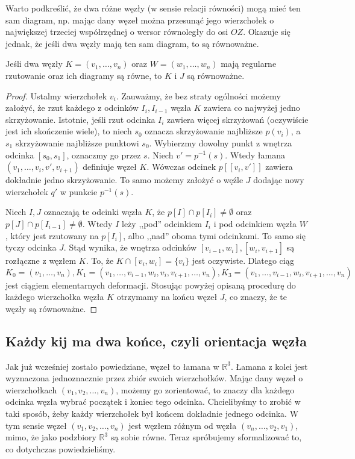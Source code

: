 Warto podkreślić, że dwa różne węzły (w sensie relacji równości) mogą mieć ten sam diagram, np. mając dany węzeł można przesunąć jego wierzchołek o największej trzeciej współrzędnej 
o wersor równoległy do osi $OZ$. Okazuje się jednak, że jeśli dwa węzły mają ten sam diagram, to są równoważne. 


\begin{twierdzenie}
 Jeśli dwa węzły $K = (v_1,\ldots, v_n)$ oraz $W = (w_1, \ldots, w_n)$ mają regularne rzutowanie oraz ich diagramy są równe, to $K$ i $J$ są równoważne.
\end{twierdzenie}
\begin{proof}
 Ustalmy wierzchołek $v_i$. Zauważmy, że bez straty ogólności możemy założyć, że rzut każdego z odcinków $I_i, I_{i-1}$ węzła $K$ zawiera co najwyżej jedno skrzyżowanie. 
 Istotnie, jeśli
 rzut odcinka $I_i$ zawiera więcej skrzyżowań (oczywiście jest ich skończenie wiele), to niech $s_0$ oznacza skrzyżowanie najbliższe $p(v_i)$, a $s_1$ skrzyżowanie najbliższe
 punktowi $s_0$. Wybierzmy dowolny punkt z wnętrza odcinka $[s_0, s_1]$, oznaczmy go przez $s$. Niech $v' = p^{-1}(s)$. Wtedy łamana $(v_1, \ldots, v_i, v', v_{i+1})$ definiuje 
 węzeł $K$. Wówczas odcinek $p[ [v_i, v']]$ zawiera dokładnie jedno skrzyżowanie. To samo możemy założyć o węźle $J$ dodając nowy wierzchołek $q'$ w punkcie $p^{-1}(s)$.
 
 Niech $I, J$ oznaczają te odcinki węzła $K$, że $p[I]\cap p[I_i]\neq\emptyset$ oraz $p[J]\cap p[I_{i-1}]\neq\emptyset$. Wtedy $I$ leży ,,pod'' odcinkiem $I_i$ i pod odcinkiem
 węzła $W$, który jest rzutowany na $p[I_i]$, albo ,,nad'' oboma tymi odcinkami. To samo się tyczy odcinka $J$. Stąd wynika, że wnętrza odcinków $[v_{i-1}, w_i], [w_i, v_{i+1}]$ są
 rozłączne z węzłem $K$. To, że $K\cap [v_i,w_i] = \lbrace v_i\rbrace$ jest oczywiste. Dlatego ciąg
 \begin{displaymath}
  K_0 = (v_1, \ldots, v_n), K_1 = (v_1, \ldots, v_{i-1}, w_i, v_i, v_{i+1}, \ldots, v_n), K_3 = (v_1, \ldots, v_{i-1}, w_i, v_{i+1}, \ldots, v_n)
 \end{displaymath}
jest ciągiem elementarnych deformacji. Stosując powyżej opisaną procedurę do każdego wierzchołka węzła $K$ otrzymamy na końcu węzeł $J$, co znaczy, że te węzły są równoważne.
 
 \end{proof}

\subsection{Każdy kij ma dwa końce, czyli orientacja węzła}
Jak już wcześniej zostało powiedziane, węzeł to łamana w $\mathbb{R}^3$. Łamana z kolei jest wyznaczona jednoznacznie przez zbiór  swoich wierzchołków. Mając dany węzeł o wierzchołkach
$(v_1, v_2, \ldots, v_n)$, możemy go zorientować, to znaczy dla każdego odcinka węzła wybrać początek i koniec tego odcinka. Chcielibyśmy to zrobić w taki sposób, żeby każdy wierzchołek
był końcem dokładnie jednego odcinka. W tym sensie węzeł $(v_1, v_2, \ldots, v_n)$ jest węzłem różnym od węzła $(v_n, \ldots, v_2, v_1)$, mimo, że jako podzbiory $\mathbb{R}^3$ są
sobie równe. Teraz spróbujemy sformalizować to, co dotychczas powiedzieliśmy.


